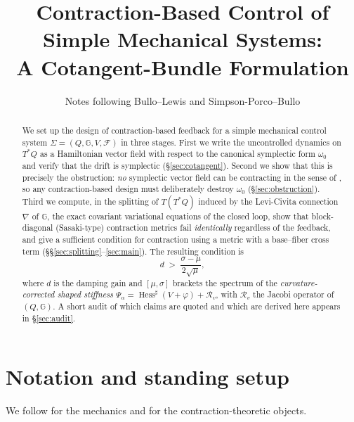 \documentclass[11pt,a4paper]{article}
\title{\bfseries Contraction-Based Control of Simple Mechanical Systems:\\
A Cotangent-Bundle Formulation}
\author{Notes following Bullo--Lewis \cite{BL04} and Simpson-Porco--Bullo \cite{SB13}}
\date{}
\newcommand{\Gm}{\mathbb{G}}                      %
\newcommand{\Hess}{\operatorname{Hess}}
\newcommand{\Jac}{\mathcal{R}}
\newcommand{\Stiff}{\Psi}
\newcommand{\Tstar}{T^{*}Q}
\theoremstyle{plain}
\theoremstyle{definition}
\theoremstyle{remark}
\begin{document}
\maketitle

\begin{abstract}
\noindent
We set up the design of contraction-based feedback for a simple mechanical control
system $\Sigma = (Q,\Gm,V,\mathcal{F})$ in three stages. First we write the
uncontrolled dynamics on $\Tstar$ as a Hamiltonian vector field with respect to
the canonical symplectic form $\omega_0$ and verify that the drift is symplectic
(\S\ref{sec:cotangent}). Second we show that this is precisely the obstruction:
\emph{no} symplectic vector field can be contracting in the sense of
\cite[Def.~2.1]{SB13}, so any contraction-based design must deliberately destroy
$\omega_0$ (\S\ref{sec:obstruction}). Third we compute, in the splitting of
$T(\Tstar)$ induced by the Levi-Civita connection $\nabla$ of $\Gm$, the exact
covariant variational equations of the closed loop, show that block-diagonal
(Sasaki-type) contraction metrics fail \emph{identically} regardless of the
feedback, and give a sufficient condition for contraction using a metric with a
base--fiber cross term (\S\S\ref{sec:splitting}--\ref{sec:main}). The resulting
condition is
\[
  d \;>\; \frac{\sigma - \mu}{2\sqrt{\mu}},
\]
where $d$ is the damping gain and $[\mu,\sigma]$ brackets the spectrum of the
\emph{curvature-corrected shaped stiffness}
$\Stiff_\alpha = \Hess^{\sharp}(V+\varphi) + \Jac_v$, with $\Jac_v$ the Jacobi
operator of $(Q,\Gm)$. A short audit of which claims are quoted and which are
derived here appears in \S\ref{sec:audit}.
\end{abstract}

\tableofcontents

\section{Notation and standing setup}
\label{sec:notation}

We follow \cite[Ch.~3--4]{BL04} for the mechanics and \cite[\S1]{SB13} for the
contraction-theoretic objects.
\end{document}
